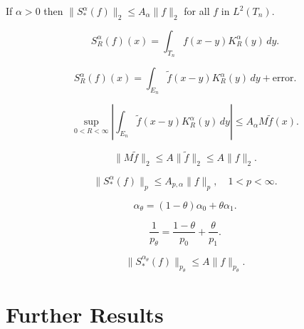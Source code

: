 \begin{lemma}\label{lem:c7-5-10}
If $\alpha > 0$ then $\|S_*^\alpha(f)\|_2 \leq A_\alpha \|f\|_2$ for all $f$ in $L^2(T_n)$.
\end{lemma}

\begin{equation}\label{eq:c7-5-11}
S_R^\alpha(f)(x) = \int_{T_n} f(x - y) K_R^\alpha(y)\,dy.
\end{equation}

\begin{equation}\label{eq:c7-5-12}
S_R^\alpha(f)(x) = \int_{E_n} \tilde{f}(x - y) K_R^\alpha(y)\,dy + \text{error}.
\end{equation}

\begin{equation}\label{eq:c7-5-13}
\sup_{0 < R < \infty} \left| \int_{E_n} \tilde{f}(x - y) K_R^\alpha(y)\,dy \right| \leq A_\alpha M\tilde{f}(x).
\end{equation}

\begin{equation}\label{eq:c7-5-14}
\|M\tilde{f}\|_2 \leq A \|\tilde{f}\|_2 \leq A \|f\|_2.
\end{equation}

\begin{equation}\label{eq:c7-5-15}
\|S_*^\alpha(f)\|_p \leq A_{p,\alpha} \|f\|_p, \quad 1 < p < \infty.
\end{equation}

\begin{equation}\label{eq:c7-5-16}
\alpha_\theta = (1 - \theta) \alpha_0 + \theta \alpha_1.
\end{equation}

\begin{equation}\label{eq:c7-5-17}
\frac{1}{p_\theta} = \frac{1 - \theta}{p_0} + \frac{\theta}{p_1}.
\end{equation}

\begin{equation}\label{eq:c7-5-18}
\|S_*^{\alpha_\theta}(f)\|_{p_\theta} \leq A \|f\|_{p_\theta}.
\end{equation}

\section{Further Results}

